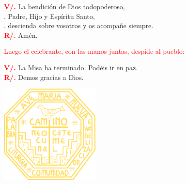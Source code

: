 \documentclass[12pt, letterpaper]{report}
\begin{document}
	\noindent
	\Large {\bfseries \textcolor{red}{V/.}} \hspace{0.5cm} La bendici\'on de Dios todopoderoso,\\
	. \hspace{1.5cm} Padre, Hijo \Huge{\textcolor{red}{}} \Large y Esp\'iritu Santo,\\
	. \hspace{1.5cm} descienda sobre vosotros y os acompa\~ne siempre.\\
	\Large {\bfseries \textcolor{red}{R/.}} \hspace{0.5cm} Am\'en.

	\large{\textcolor{red}{Luego el celebrante, con las manos juntas, despide al pueblo:}}

	\noindent
	\Large {\bfseries \textcolor{red}{V/.}} \hspace{0.5cm} La Misa ha terminado. Pod\'eis ir en paz.\\
	\noindent
	\Large {\bfseries \textcolor{red}{R/.}} \hspace{0.5cm} Demos gracias a Dios.

	\newpage

	\pagecolor{red}\afterpage{\nopagecolor}

	\vspace*{\fill}
	\begin{center}
		\includegraphics{camino}
	\end{center}
	\vspace*{\fill}

\end{document}
